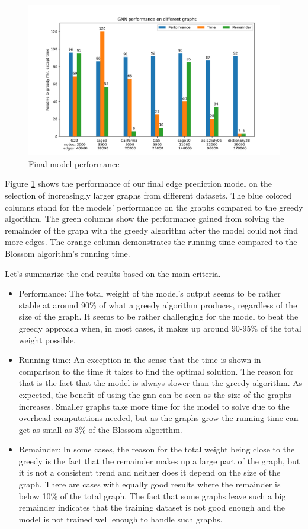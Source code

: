 \begin{figure}[H]
    \centering
    \hspace*{-2cm}
    \includegraphics[scale=0.8]{figures/FINALResults}
    \caption{Final model performance}
    \label{Final model performance}
\end{figure}

Figure \ref{Final model performance} shows the performance of our final edge prediction model on the selection of increasingly larger graphs from different datasets. The blue colored columns stand for the models' performance on the graphs compared to the greedy algorithm. The green columns show the performance gained from solving the remainder of the graph with the greedy algorithm after the model could not find more edges. The orange column demonstrates the running time compared to the Blossom algorithm's running time.

Let's summarize the end results based on the main criteria.
\begin{itemize}
\item Performance: The total weight of the model's output seems to be rather stable at around 90\% of what a greedy algorithm produces, regardless of the size of the graph. It seems to be rather challenging for the model to beat the greedy approach when, in most cases, it makes up around 90-95\% of the total weight possible.
\item Running time: An exception in the sense that the time is shown in comparison to the time it takes to find the optimal solution. The reason for that is the fact that the model is always slower than the greedy algorithm. As expected, the benefit of using the \gls{gnn} can be seen as the size of the graphs increases. Smaller graphs take more time for the model to solve due to the overhead computations needed, but as the graphs grow the running time can get as small as 3\% of the Blossom algorithm.
\item Remainder: In some cases, the reason for the total weight being close to the greedy is the fact that the remainder makes up a large part of the graph, but it is not a consistent trend and neither does it depend on the size of the graph. There are cases with equally good results where the remainder is below 10\% of the total graph. The fact that some graphs leave such a big remainder indicates that the training dataset is not good enough and the model is not trained well enough to handle such graphs.
\end{itemize}

